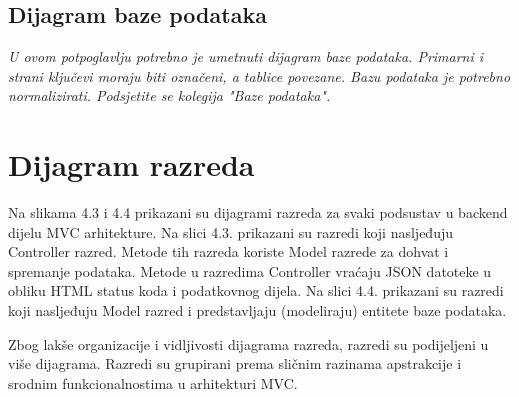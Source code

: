 				
				
			\subsection{Dijagram baze podataka}
				\textit{ U ovom potpoglavlju potrebno je umetnuti dijagram baze podataka. Primarni i strani ključevi moraju biti označeni, a tablice povezane. Bazu podataka je potrebno normalizirati. Podsjetite se kolegija "Baze podataka".}
				
	
			\eject
			
			
		\section{Dijagram razreda}
		
			
			\textit{}

			Na slikama 4.3 i 4.4 prikazani su dijagrami razreda za svaki podsustav u backend dijelu MVC arhitekture. Na slici 4.3. prikazani su razredi koji nasljeđuju Controller razred. Metode tih razreda koriste Model razrede za dohvat i spremanje podataka. Metode u razredima Controller vraćaju JSON datoteke u obliku HTML status koda i podatkovnog dijela. Na slici 4.4. prikazani su razredi koji nasljeđuju Model razred i predstavljaju (modeliraju) entitete baze podataka.
			
			Zbog lakše organizacije i vidljivosti dijagrama razreda, razredi su podijeljeni u više dijagrama. Razredi su grupirani prema sličnim razinama apstrakcije i srodnim funkcionalnostima u arhitekturi MVC.
			
